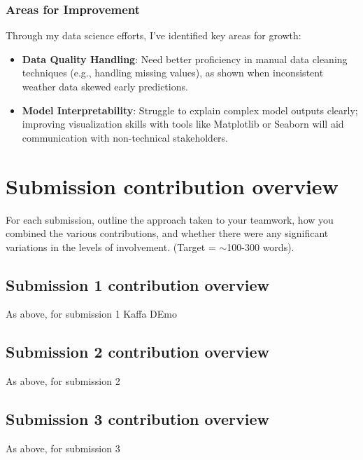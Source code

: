 \documentclass[a4paper, 11pt]{report}
\begin{document}
\subsubsection*{Areas for Improvement}
Through my data science efforts, I’ve identified key areas for growth:
\begin{itemize}
    \item \textbf{Data Quality Handling}: Need better proficiency in manual data cleaning techniques (e.g., handling missing values), as shown when inconsistent weather data skewed early predictions.
    \item \textbf{Model Interpretability}: Struggle to explain complex model outputs clearly; improving visualization skills with tools like Matplotlib or Seaborn will aid communication with non-technical stakeholders.
\end{itemize}


\newpage

\section{Submission contribution overview}

For each submission, outline the approach taken to your teamwork, how you combined the various contributions, and whether there were any significant variations in the levels of involvement. (Target = $\sim$100-300 words).

\subsection{Submission 1 contribution overview}

As above, for submission 1 Kaffa DEmo

\subsection{Submission 2 contribution overview}

As above, for submission 2

\subsection{Submission 3 contribution overview}

As above, for submission 3 



\newpage



\end{document}
